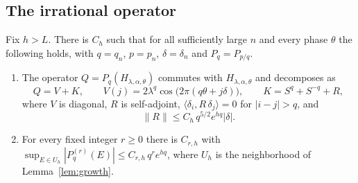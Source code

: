 \subsection{The irrational operator}

\begin{proposition}\label{prop:poly}
Fix $h>L$. There is $C_h$ such that for all sufficiently large $n$ and every phase $\theta$ the following holds, with $q=q_n$, $p=p_n$, $\delta=\delta_n$ and $P_q=P_{p/q}$.
\begin{enumerate}
\item The operator $Q=P_q(H_{\lambda,\alpha,\theta})$ commutes with $H_{\lambda,\alpha,\theta}$ and decomposes as
\[
Q=V+K,\qquad V(j)=2\lambda^q\cos\bigl(2\pi(q\theta+j\delta)\bigr),\qquad K=S^q+S^{-q}+R,
\]
where $V$ is diagonal, $R$ is self-adjoint, $\langle\delta_i,R\,\delta_j\rangle=0$ for $|i-j|>q$, and
\[
\|R\|\le C_h\,q^{5/2}e^{hq}|\delta|.
\]
\item For every fixed integer $r\ge0$ there is $C_{r,h}$ with $\sup_{E\in U_h}|P_q^{(r)}(E)|\le C_{r,h}\,q^re^{hq}$, where $U_h$ is the neighborhood of Lemma~\ref{lem:growth}.
\end{enumerate}
\end{proposition}

